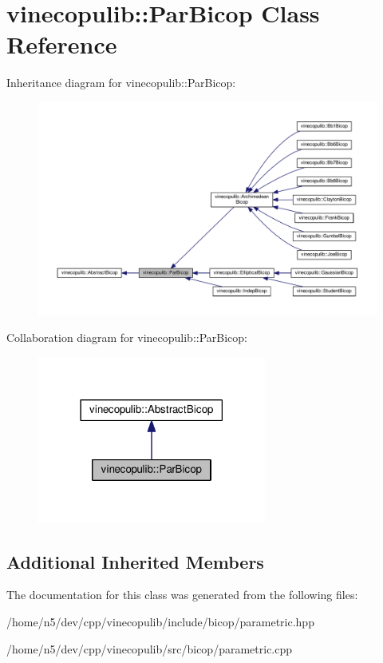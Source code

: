 \hypertarget{classvinecopulib_1_1_par_bicop}{}\section{vinecopulib\+:\+:Par\+Bicop Class Reference}
\label{classvinecopulib_1_1_par_bicop}


Inheritance diagram for vinecopulib\+:\+:Par\+Bicop\+:\nopagebreak
\begin{figure}[H]
\begin{center}
\leavevmode
\includegraphics[width=350pt]{classvinecopulib_1_1_par_bicop__inherit__graph}
\end{center}
\end{figure}


Collaboration diagram for vinecopulib\+:\+:Par\+Bicop\+:\nopagebreak
\begin{figure}[H]
\begin{center}
\leavevmode
\includegraphics[width=213pt]{classvinecopulib_1_1_par_bicop__coll__graph}
\end{center}
\end{figure}
\subsection*{Additional Inherited Members}


The documentation for this class was generated from the following files\+:\begin{DoxyCompactItemize}
\item 
/home/n5/dev/cpp/vinecopulib/include/bicop/parametric.\+hpp\item 
/home/n5/dev/cpp/vinecopulib/src/bicop/parametric.\+cpp\end{DoxyCompactItemize}
